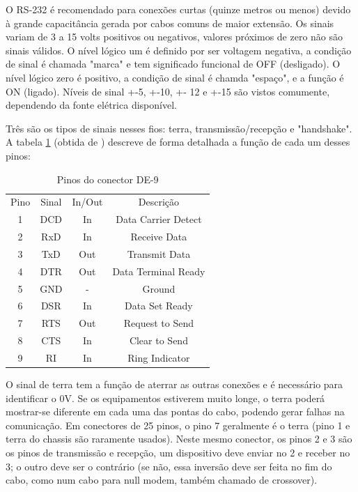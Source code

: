 \documentclass[brazil,times,12pt]{abnt}
\begin{document}
	O RS-232 é recomendado para conexões curtas (quinze metros ou menos) devido à
	grande capacitância gerada por cabos comuns de maior extensão. Os sinais variam
	de 3 a 15 volts positivos ou negativos, valores próximos de zero não são
	sinais válidos. O nível lógico um é definido por ser voltagem negativa, a
	condição de sinal é chamada "marca" e tem significado funcional de OFF
	(desligado). O nível lógico zero é positivo, a condição de sinal é chamda
	"espaço", e a função é ON (ligado). Níveis de sinal +-5, +-10, +- 12 e +-15
	são vistos comumente, dependendo da fonte elétrica
	disponível.\cite{strangio:rs232-standard}
	
	Três são os tipos de sinais nesses fios: terra, transmissão/recepção e
	"handshake". A tabela \ref{tab:de9} (obtida de \cite{anton:rs232-pinout})
	descreve de forma detalhada a função de cada um desses pinos:

	\begin{table}[h]
	\begin{center}
	\begin{tabular}{|c|c|c|c|}
		Pino & Sinal & In/Out & Descrição \\
		1 & DCD & In  & Data Carrier Detect \\
		2 & RxD & In  & Receive Data \\
		3 & TxD & Out & Transmit Data \\
		4 & DTR & Out & Data Terminal Ready \\
		5 & GND &  -  & Ground \\
		6 & DSR & In  & Data Set Ready \\
		7 & RTS & Out & Request to Send \\
		8 & CTS & In  & Clear to Send \\
		9 & RI  & In  & Ring Indicator
	\end{tabular}
	\end{center}
	\caption{Pinos do conector DE-9}
	\label{tab:de9}
	\end{table}
	
	O sinal de terra tem a função de aterrar as outras conexões e é necessário
	para identificar o 0V. Se os equipamentos estiverem muito longe, o terra 
	poderá mostrar-se diferente em cada uma das pontas do cabo, podendo gerar
	falhas na comunicação. Em conectores de 25 pinos, o pino 7 geralmente é o
	terra (pino 1 e terra do chassis são raramente usados). Neste mesmo conector,
	os pinos 2 e 3 são os pinos de transmissão e recepção, um dispositivo deve
	enviar no 2 e receber no 3; o outro deve ser o contrário (se não, essa
	inversão deve ser feita no fim do cabo, como num cabo para null modem, também
	chamado de crossover).
	
\end{document}
